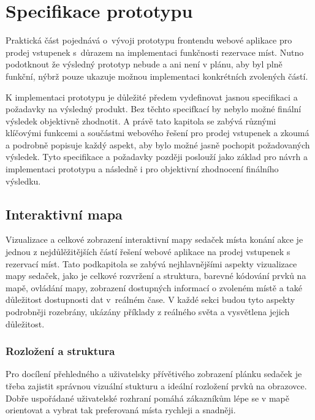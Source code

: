 \chapter{Specifikace prototypu}
\label{ch:specifikace}
Praktická část pojednává o~vývoji prototypu frontendu webové aplikace pro prodej vstupenek s~důrazem na implementaci funkčnosti rezervace míst.
Nutno podotknout že výsledný prototyp nebude a ani není v plánu, aby byl plně funkční, nýbrž pouze ukazuje možnou implementaci konkrétních zvolených částí.

K implementaci prototypu je důležité předem vydefinovat jasnou specifikaci a požadavky na výsledný produkt.
Bez těchto specifkací by nebylo možné finální výsledek objektivně zhodnotit.
A právě tato kapitola se zabývá různými klíčovými funkcemi a součástmi webového řešení pro prodej vstupenek a zkoumá a podrobně popisuje každý aspekt, aby bylo možné jasně pochopit požadovaných výsledek.
Tyto specifikace a požadavky později poslouží jako základ pro návrh a implementaci prototypu a následně i pro objektivní zhodnocení finálního výsledku.

\section{Interaktivní mapa}
\label{sec:specifikace-interaktivni-mapa}
Vizualizace a celkové zobrazení interaktivní mapy sedaček místa konání akce je jednou z nejdůlěžitějších částí řešení webové aplikace na prodej vstupenek s rezervací míst.
Tato podkapitola se zabývá nejhlavnějšími aspekty vizualizace mapy sedaček, jako je celkové rozvržení a struktura, barevné kódování prvků na mapě, ovládání mapy, zobrazení dostupných informací o zvoleném místě a také důležitost dostupnosti dat v~reálném čase.
V každé sekci budou tyto aspekty podrobněji rozebrány, ukázány příklady z reálného světa a vysvětlena jejich důležitost.

\subsection{Rozložení a struktura}
\label{subsec:specifikace-interaktivni-mapa-rozlozeni-a-struktura}
Pro docílení přehledného a uživatelsky přívětivého zobrazení plánku sedaček je třeba zajistit správnou vizuální stukturu a ideální rozložení prvků na obrazovce.
Dobře uspořádané uživatelské rozhraní pomáhá zákazníkům lépe se v mapě orientovat a vybrat tak preferovaná místa rychleji a snadněji.

